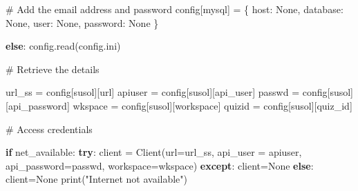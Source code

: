\documentclass[
  letterpaper,
  DIV=11,
  numbers=noendperiod]{scrreprt}
\newenvironment{Shaded}{\begin{snugshade}}{\end{snugshade}}
\newcommand{\BuiltInTok}[1]{\textcolor[rgb]{0.00,0.23,0.31}{#1}}
\newcommand{\CommentTok}[1]{\textcolor[rgb]{0.37,0.37,0.37}{#1}}
\newcommand{\ControlFlowTok}[1]{\textcolor[rgb]{0.00,0.23,0.31}{\textbf{#1}}}
\newcommand{\NormalTok}[1]{\textcolor[rgb]{0.00,0.23,0.31}{#1}}
\newcommand{\OperatorTok}[1]{\textcolor[rgb]{0.37,0.37,0.37}{#1}}
\newcommand{\StringTok}[1]{\textcolor[rgb]{0.13,0.47,0.30}{#1}}
\newcommand{\VariableTok}[1]{\textcolor[rgb]{0.07,0.07,0.07}{#1}}
\begin{document}
\begin{itemize}
\begin{Shaded}
\begin{Highlighting}[]
  \CommentTok{\# Add the email address and password}
\NormalTok{    config[}\StringTok{\textquotesingle{}mysql\textquotesingle{}}\NormalTok{] }\OperatorTok{=}\NormalTok{ \{}
        \StringTok{\textquotesingle{}host\textquotesingle{}}\NormalTok{: }\VariableTok{None}\NormalTok{,}
        \StringTok{\textquotesingle{}database\textquotesingle{}}\NormalTok{: }\VariableTok{None}\NormalTok{,}
        \StringTok{\textquotesingle{}user\textquotesingle{}}\NormalTok{: }\VariableTok{None}\NormalTok{,}
        \StringTok{\textquotesingle{}password\textquotesingle{}}\NormalTok{: }\VariableTok{None}
\NormalTok{    \}}

\ControlFlowTok{else}\NormalTok{:}
\NormalTok{  config.read(}\StringTok{\textquotesingle{}config.ini\textquotesingle{}}\NormalTok{)}

\CommentTok{\# Retrieve the details }

\NormalTok{url\_ss }\OperatorTok{=}\NormalTok{ config[}\StringTok{\textquotesingle{}susol\textquotesingle{}}\NormalTok{][}\StringTok{\textquotesingle{}url\textquotesingle{}}\NormalTok{]}
\NormalTok{apiuser }\OperatorTok{=}\NormalTok{ config[}\StringTok{\textquotesingle{}susol\textquotesingle{}}\NormalTok{][}\StringTok{\textquotesingle{}api\_user\textquotesingle{}}\NormalTok{]}
\NormalTok{passwd }\OperatorTok{=}\NormalTok{ config[}\StringTok{\textquotesingle{}susol\textquotesingle{}}\NormalTok{][}\StringTok{\textquotesingle{}api\_password\textquotesingle{}}\NormalTok{]}
\NormalTok{wkspace }\OperatorTok{=}\NormalTok{ config[}\StringTok{\textquotesingle{}susol\textquotesingle{}}\NormalTok{][}\StringTok{\textquotesingle{}workspace\textquotesingle{}}\NormalTok{]}
\NormalTok{quizid }\OperatorTok{=}\NormalTok{ config[}\StringTok{\textquotesingle{}susol\textquotesingle{}}\NormalTok{][}\StringTok{\textquotesingle{}quiz\_id\textquotesingle{}}\NormalTok{]}

\CommentTok{\# Access credentials}

\ControlFlowTok{if}\NormalTok{ net\_available:}
  \ControlFlowTok{try}\NormalTok{:}
\NormalTok{    client }\OperatorTok{=}\NormalTok{ Client(url}\OperatorTok{=}\NormalTok{url\_ss,}
\NormalTok{    api\_user }\OperatorTok{=}\NormalTok{ apiuser, }
\NormalTok{    api\_password}\OperatorTok{=}\NormalTok{passwd,}
\NormalTok{    workspace}\OperatorTok{=}\NormalTok{wkspace)}
  \ControlFlowTok{except}\NormalTok{:}
\NormalTok{    client}\OperatorTok{=}\VariableTok{None}
\ControlFlowTok{else}\NormalTok{:}
\NormalTok{  client}\OperatorTok{=}\VariableTok{None}
  \BuiltInTok{print}\NormalTok{(}\StringTok{"Internet not available"}\NormalTok{)}
\end{Highlighting}
\end{Shaded}
\end{itemize}
\end{document}
